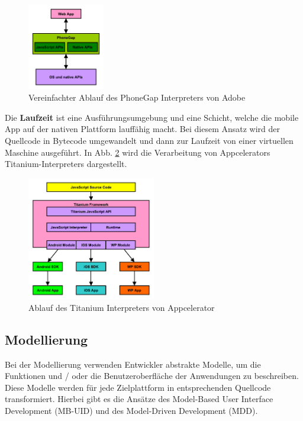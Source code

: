 \begin{figure}[htbp]
	\centering
	\includegraphics[width=0.3\textwidth]{Bilder/Interpretation_Web_PhoneGap}
	\caption{Vereinfachter Ablauf des PhoneGap Interpreters von Adobe}\label{graph_interpreter_PhoneGap}
\end{figure} 

\medskip
Die \textbf{Laufzeit} ist eine Ausführungsumgebung und eine Schicht, welche die mobile App auf der nativen Plattform lauffähig macht. Bei diesem Ansatz wird der Quellcode in Bytecode umgewandelt und dann zur Laufzeit von einer virtuellen Maschine ausgeführt. In Abb. \ref{graph_interpreter_Titanium} wird die Verarbeitung von Appcelerators Titanium-Interpreters dargestellt.

\begin{figure}[htbp]
	\centering
	\includegraphics[width=0.5\textwidth]{Bilder/Interpretation_Runtime_Titanium}
	\caption{Ablauf des Titanium Interpreters von Appcelerator}\label{graph_interpreter_Titanium}
\end{figure}

\subsection{Modellierung}
Bei der Modellierung verwenden Entwickler abstrakte Modelle, um die Funktionen und / oder die Benutzeroberfläche der Anwendungen zu beschreiben. Diese Modelle werden für jede Zielplattform in entsprechenden Quellcode transformiert. Hierbei gibt es die Ansätze des Model-Based User Interface Development (MB-UID) und des Model-Driven Development (MDD).

